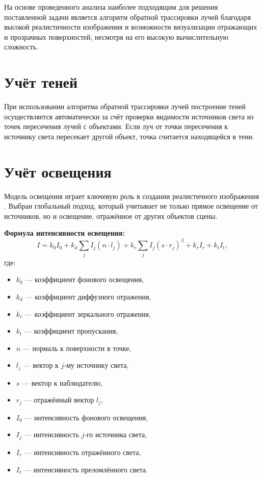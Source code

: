 На основе проведенного анализа наиболее подходящим для решения поставленной задачи является алгоритм обратной трассировки лучей благодаря высокой реалистичности изображения и возможности визуализации отражающих и прозрачных поверхностей, несмотря на его высокую вычислительную сложность.

\section{Учёт теней}

При использовании алгоритма обратной трассировки лучей построение теней осуществляется автоматически за счёт проверки видимости источников света из точек пересечения лучей с объектами. Если луч от точки пересечения к источнику света пересекает другой объект, точка считается находящейся в тени.

\section{Учёт освещения}

Модель освещения играет ключевую роль в создании реалистичного изображения \cite{rodgers, rogers_book}. Выбран глобальный подход, который учитывает не только прямое освещение от источников, но и освещение, отражённое от других объектов сцены.

\textbf{Формула интенсивности освещения:}
\begin{equation}
	I = k_0I_0 + k_d\sum\limits_{j}^{}I_j(n \cdot l_j) + k_r\sum\limits_{j}^{}I_j(s \cdot r_j)^{\beta} + k_rI_r + k_tI_t,
\end{equation}
где:
\begin{itemize}
	\item $k_0$ — коэффициент фонового освещения,
	\item $k_d$ — коэффициент диффузного отражения,
	\item $k_r$ — коэффициент зеркального отражения,
	\item $k_t$ — коэффициент пропускания,
	\item $n$ — нормаль к поверхности в точке,
	\item $l_j$ — вектор к $j$-му источнику света,
	\item $s$ — вектор к наблюдателю,
	\item $r_j$ — отражённый вектор $l_j$,
	\item $I_0$ — интенсивность фонового освещения,
	\item $I_j$ — интенсивность $j$-го источника света,
	\item $I_r$ — интенсивность отражённого света,
	\item $I_t$ — интенсивность преломлённого света.
\end{itemize}

